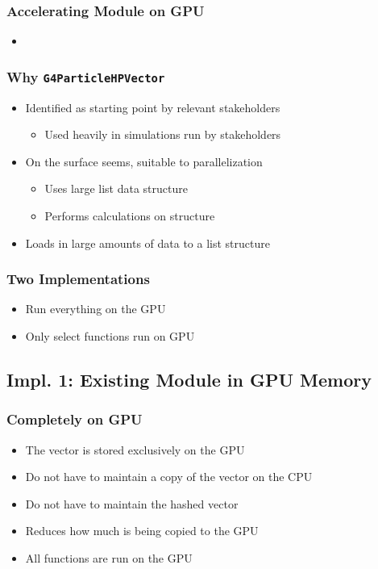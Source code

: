 \documentclass{beamer}
\newcommand\pro{\item[$+$]}
\newcommand\con{\item[$-$]}
\begin{document}
\begin{frame}
\frametitle{Accelerating Module on GPU}
\begin{itemize}
\item
\end{itemize}
\end{frame}

\begin{frame}
\frametitle{Why \texttt{G4ParticleHPVector}}
\begin{itemize}
\item Identified as starting point by relevant stakeholders
\begin{itemize}
\item Used heavily in simulations run by stakeholders
\end{itemize}
\item On the surface seems, suitable to parallelization
\begin{itemize}
\item Uses large list data structure
\item Performs calculations on structure
\end{itemize}
\item Loads in large amounts of data to a list structure
\end{itemize}
\end{frame}

\begin{frame}
\frametitle{Two Implementations}
\begin{itemize}
\item Run everything on the GPU
\item Only select functions run on GPU
\end{itemize}
\end{frame}

\subsection{Impl. 1: Existing Module in GPU Memory}
\begin{frame}
\frametitle{Completely on GPU}
\begin{itemize}
\item The vector is stored exclusively on the GPU
\pro Do not have to maintain a copy of the vector on the CPU
\pro Do not have to maintain the hashed vector
\pro Reduces how much is being copied to the GPU
\con All functions are run on the GPU
\end{itemize}
\end{frame}
\end{document}
